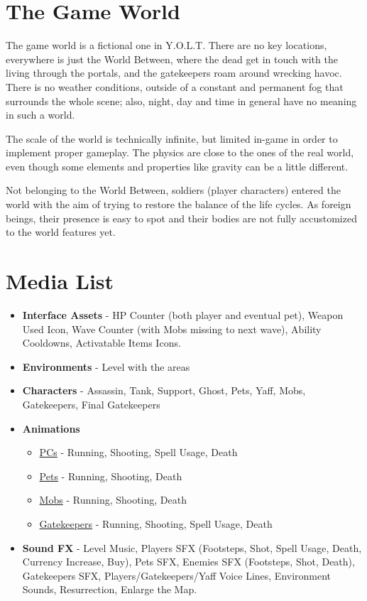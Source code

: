 \documentclass[12pt]{article}
\begin{document}
\newpage

\section{The Game World}

The game world is a fictional one in Y.O.L.T. There are no key locations, everywhere is just the World Between, where the dead get in touch with the living through the portals, and the gatekeepers roam around wrecking havoc. There is no weather conditions, outside of a constant and permanent fog that surrounds the whole scene; also, night, day and time in general have no meaning in such a world.

The scale of the world is technically infinite, but limited in-game in order to implement proper gameplay. The physics are close to the ones of the real world, even though some elements and properties like gravity can be a little different.

Not belonging to the World Between, soldiers (player characters) entered the world with the aim of trying to restore the balance of the life cycles. As foreign beings, their presence is easy to spot and their bodies are not fully accustomized to the world features yet.

\newpage

\section{Media List}

\begin{itemize}
	\item \textbf{Interface Assets} - HP Counter (both player and eventual pet), Weapon Used Icon, Wave Counter (with Mobs missing to next wave), Ability Cooldowns, Activatable Items Icons.
	\item \textbf{Environments} - Level with the areas
	\item \textbf{Characters} - Assassin, Tank, Support, Ghost, Pets, Yaff, Mobs, Gatekeepers, Final Gatekeepers
	\item \textbf{Animations}
	\begin{itemize}
		\item \underline{PCs} - Running, Shooting, Spell Usage, Death
		\item \underline{Pets} - Running, Shooting, Death
		\item \underline{Mobs} - Running, Shooting, Death
		\item \underline{Gatekeepers} - Running, Shooting, Spell Usage, Death
	\end{itemize}
	\item \textbf{Sound FX} - Level Music, Players SFX (Footsteps, Shot, Spell Usage, Death, Currency Increase, Buy), Pets SFX, Enemies SFX (Footsteps, Shot, Death), Gatekeepers SFX, Players/Gatekeepers/Yaff Voice Lines, Environment Sounds, Resurrection, Enlarge the Map.
\end{itemize}
\end{document}
